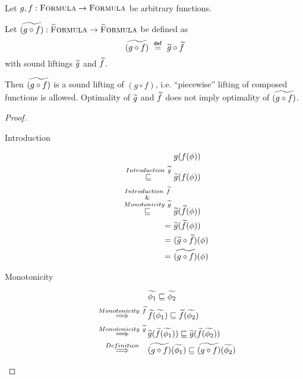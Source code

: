 \begin{lemma}~\\
    Let $g, f : \textup{\textsc{Formula}} \rightarrow \textup{\textsc{Formula}}$ be arbitrary functions.
    
    Let $\widetilde{(g \circ f)} : \textup{\textsc{\ensuremath{\widetilde{\text{F}}}ormula}} \rightarrow \textup{\textsc{\ensuremath{\widetilde{\text{F}}}ormula}}$ be defined as
    \begin{displaymath}
    \widetilde{(g \circ f)} ~\overset{\textup{\textmd{\textsf{def}}}}{=}~ \widetilde{g} \circ \widetilde{f}
    \end{displaymath}
    with sound liftings $\widetilde{g}$ and $\widetilde{f}$.
    
    Then $\widetilde{(g \circ f)}$ is a sound lifting of $(g \circ f)$, i.e. “piecewise” lifting of composed functions is allowed.
    Optimality of $\widetilde{g}$ and $\widetilde{f}$ does not imply optimality of $\widetilde{(g \circ f)}$.
\end{lemma}
\begin{proof}
    \begin{description}
        \item[Introduction]
        \begin{align*}
        &g(f(\phi))\\
        \overset{Introduction~\widetilde{g}}{\sqsubseteq}~
        &\widetilde{g}(f(\phi))\\
        \overset{\substack{Introduction~\widetilde{f}\\\&\\Monotonicity~\widetilde{g}}}{\sqsubseteq}~
        &\widetilde{g}(\widetilde{f}(\phi))\\
        =~
        &\widetilde{g}(\widetilde{f}(\phi))\\
        =~
        &(\widetilde{g} \circ \widetilde{f})(\phi)\\
        =~
        &\widetilde{(g \circ f)}(\phi)
        \end{align*}
        
        \item[Monotonicity]
        \begin{align*}
        &\widetilde{\phi_1} \sqsubseteq \widetilde{\phi_2}\\
        \overset{Monotonicity~\widetilde{f}}{\quad\quad\implies\quad\quad}
        &\widetilde{f}(\widetilde{\phi_1}) \sqsubseteq \widetilde{f}(\widetilde{\phi_2})\\
        \overset{Monotonicity~\widetilde{g}}{\quad\quad\implies\quad\quad}
        &\widetilde{g}(\widetilde{f}(\widetilde{\phi_1})) \sqsubseteq \widetilde{g}(\widetilde{f}(\widetilde{\phi_2}))\\
        \overset{Definition}{\quad\quad\implies\quad\quad}
        &\widetilde{(g \circ f)}(\widetilde{\phi_1}) \sqsubseteq \widetilde{(g \circ f)}(\widetilde{\phi_2})
        \end{align*}
    \end{description}
\end{proof}

